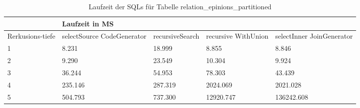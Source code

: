 \begin{table}[H]
	\centering
	\begin{tabular}{l|l|l|l|l|l|}
		\cline{2-6}
		& \multicolumn{5}{|l|}{Laufzeit in MS}                                                                                                                                                  \\ \hline
		\multicolumn{1}{|l|}{\multirow{2}{2cm}{Rerkusions-tiefe}} & \multicolumn{2}{|l|}{\multirow{2}{3cm}{selectSource CodeGenerator}} & \multirow{2}{2.8cm}{recursiveSearch} & \multirow{2}{2.5cm}{recursive WithUnion} & \multirow{2}{2.5cm}{selectInner JoinGenerator} \\
		\multicolumn{1}{|l|}{}
		& \multicolumn{2}{|l|}{}                                           &                                  &                                     &                                           \\ \hline
		
	\multicolumn{1}{|l|}{1}                                 & \multicolumn{2}{l|}{8.231}                                       & 18.999                                                & 8.855                                                     & 8.846                                                           \\ \hline
	\multicolumn{1}{|l|}{2}                                 & \multicolumn{2}{l|}{9.290}                                       & 23.549                                                & 10.304                                                    & 9.924                                                           \\ \hline
	\multicolumn{1}{|l|}{3}                                 & \multicolumn{2}{l|}{36.244}                                      & 54.953                                                & 78.303                                                    & 43.439                                                          \\ \hline
	\multicolumn{1}{|l|}{4}                                 & \multicolumn{2}{l|}{235.146}                                     & 287.319                                               & 2024.069                                                  & 2021.028                                                        \\ \hline
	\multicolumn{1}{|l|}{5}                                 & \multicolumn{2}{l|}{504.793}                                     & 737.300                                               & 12920.747                                                 & 136242.608                                                      \\ \hline
	
		
		
	\end{tabular}
	\caption{Laufzeit der SQLs für Tabelle relation\_epinions\_partitioned}
\end{table}




